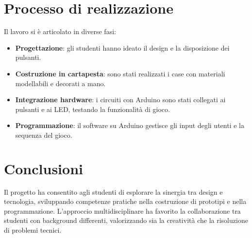 \documentclass[a4paper,12pt]{report}
\begin{document}
\section{Processo di realizzazione}
Il lavoro si è articolato in diverse fasi:
\begin{itemize}
    \item \textbf{Progettazione}: gli studenti hanno ideato il design e la disposizione dei pulsanti.
    \item \textbf{Costruzione in cartapesta}: sono stati realizzati i case con materiali modellabili e decorati a mano.
    \item \textbf{Integrazione hardware}: i circuiti con Arduino sono stati collegati ai pulsanti e ai LED, testando la funzionalità di gioco.
    \item \textbf{Programmazione}: il software su Arduino gestisce gli input degli utenti e la sequenza del gioco.
\end{itemize}

\section{Conclusioni}
Il progetto ha consentito agli studenti di esplorare la sinergia tra design e tecnologia, sviluppando competenze pratiche nella costruzione di prototipi e nella programmazione. L'approccio multidisciplinare ha favorito la collaborazione tra studenti con background differenti, valorizzando sia la creatività che la risoluzione di problemi tecnici.
\end{document}
